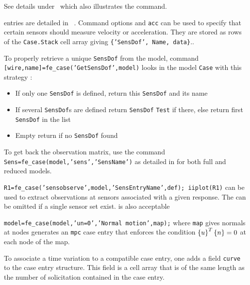 
See details under \rigid\ which also illustrates the  command.


 entries are detailed in ~. Command options  and {\tt acc} can be used to specify that certain sensors should measure velocity or acceleration. They are stored as rows of the {\tt Case.Stack} cell array giving {\tt \{'SensDof', Name, data\}}.. 

To properly retrieve a unique {\tt SensDof} from the model, command {\tt [wire,name]=fe\_case('GetSensDof',model)} looks in the model {\tt Case} with this strategy :
\begin{itemize}
\item If only one {\tt SensDof} is defined, return this {\tt SensDof} and its name
\item If several {\tt SensDof}s are defined return {\tt SensDof} {\tt Test} if there, else return first {\tt SensDof} in the list
\item Empty return if no {\tt SensDof} found
\end{itemize}

To get back the observation matrix, use the command {\tt Sens=fe\_case(model,'sens','SensName')} as detailed in  for both full and reduced models.

{\tt R1=fe\_case('sensobserve',model,'SensEntryName',def); iiplot(R1)} can be used to extract observations at sensors associated with a given response. The  can be omitted if a single sensor set exist.  is also acceptable 


{\tt model=fe\_case(model,'un=0','Normal motion',map);} where {\tt map} gives normals at nodes generates an {\tt mpc} case entry that enforces the condition $\left\{u\right\}^T\left\{n\right\}=0$ at each node of the map.



To associate a time variation to a compatible case entry, one adds a field {\tt curve} to the case entry structure. This field is a cell array that is of the same length as the number of solicitation contained in the case entry. 

